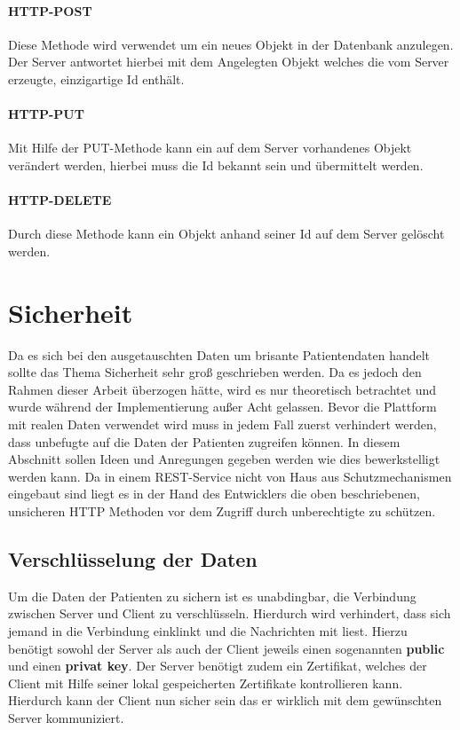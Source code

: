 \paragraph{HTTP-POST}
Diese Methode wird verwendet um ein neues Objekt in der Datenbank anzulegen. Der Server antwortet hierbei mit dem Angelegten Objekt welches die vom Server erzeugte, einzigartige Id enthält.
\paragraph{HTTP-PUT}
Mit Hilfe der PUT-Methode kann ein auf dem Server vorhandenes Objekt verändert werden, hierbei muss die Id bekannt sein und übermittelt werden.
\paragraph{HTTP-DELETE}
Durch diese Methode kann ein Objekt anhand seiner Id auf dem Server gelöscht werden.

\section{Sicherheit}
Da es sich bei den ausgetauschten Daten um brisante Patientendaten handelt sollte das Thema Sicherheit sehr groß geschrieben werden. Da es jedoch den Rahmen dieser Arbeit überzogen hätte, wird es nur theoretisch betrachtet und wurde während der Implementierung außer Acht gelassen. Bevor die Plattform mit realen Daten verwendet wird muss in jedem Fall zuerst verhindert werden, dass unbefugte auf die Daten der Patienten zugreifen können. In diesem Abschnitt sollen Ideen und Anregungen gegeben werden wie dies bewerkstelligt werden kann. 
Da in einem REST-Service nicht von Haus aus Schutzmechanismen eingebaut sind liegt es in der Hand des Entwicklers die oben beschriebenen, unsicheren HTTP Methoden vor dem Zugriff durch unberechtigte zu schützen.

\subsection{Verschlüsselung der Daten}
Um die Daten der Patienten zu sichern ist es unabdingbar, die Verbindung zwischen Server und Client zu verschlüsseln. Hierdurch wird verhindert, dass sich jemand in die Verbindung einklinkt und die Nachrichten mit liest. 
Hierzu benötigt sowohl der Server als auch der Client jeweils einen sogenannten \textbf{public} und einen \textbf{privat key}. Der Server benötigt zudem ein Zertifikat, welches der Client mit Hilfe seiner lokal gespeicherten Zertifikate kontrollieren kann. Hierdurch kann der Client nun sicher sein das er wirklich mit dem gewünschten Server kommuniziert.

